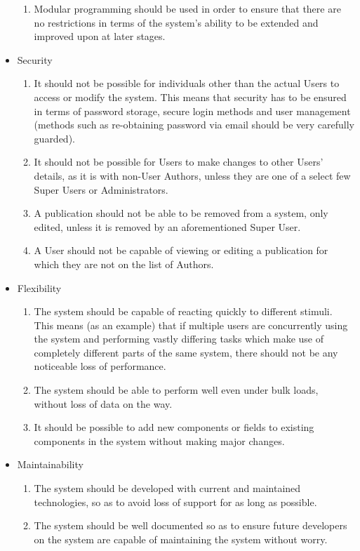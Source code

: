 \documentclass[10pt,a4paper]{exam}
\begin{document}
\begin{itemize}
\begin{enumerate}
			\item Modular programming should be used in order to ensure that there are no restrictions in terms of the system's ability to be extended and improved upon at later stages.
		\end{enumerate}
		\item Security
		\begin{enumerate}
			\item It should not be possible for individuals other than the actual Users to access or modify the system. This means that security has to be ensured in terms of password storage, secure login methods and user management (methods such as re-obtaining password via email should be very carefully guarded).
			\item It should not be possible for Users to make changes to other Users' details, as it is with non-User Authors, unless they are one of a select few Super Users or Administrators.
			\item A publication should not be able to be removed from a system, only edited, unless it is removed by an aforementioned Super User.
			\item A User should not be capable of viewing or editing a publication for which they are not on the list of Authors.
		\end{enumerate}
		\item Flexibility
		\begin{enumerate}
			\item The system should be capable of reacting quickly to different stimuli. This means (as an example) that if multiple users are concurrently using the system and performing vastly differing tasks which make use of completely different parts of the same system, there should not be any noticeable loss of performance.
			\item The system should be able to perform well even under bulk loads, without loss of data on the way.
			\item It should be possible to add new components or fields to existing components in the system without making major changes. 
		\end{enumerate}
		\item Maintainability
		\begin{enumerate}
			\item The system should be developed with current and maintained technologies, so as to avoid loss of support for as long as possible.
			\item The system should be well documented so as to ensure future developers on the system are capable of maintaining the system without worry.

\end{enumerate}
\end{itemize}
\end{document}
